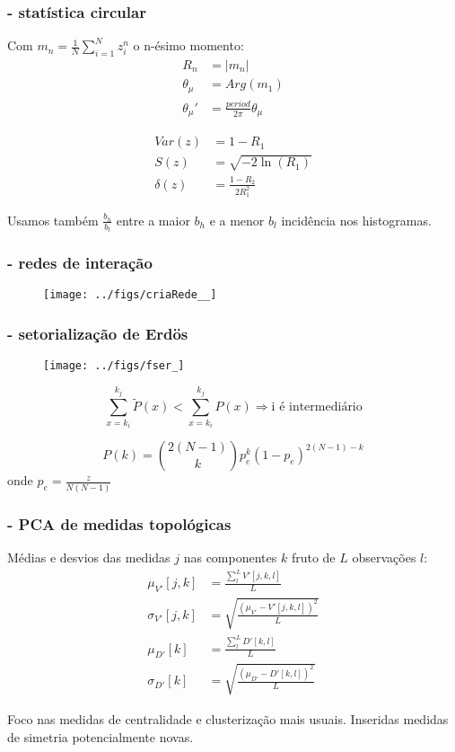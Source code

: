\documentclass[10pt]{beamer}
\begin{document}
\begin{frame}
\frametitle{ - statística circular}
Com $m_n=\frac{1}{N}\sum_{i=1}^N z_i^n$ o n-ésimo momento:
\begin{align}\label{eq:cmom}
    R_n&=|m_n| \nonumber \\
    \theta_\mu&=Arg(m_1) \\
    \theta_\mu'&=\frac{period}{2\pi} \theta_\mu \nonumber
\end{align}

\begin{align}
    Var(z)&=1 - R_1 \nonumber\\
    S(z)&= \sqrt{-2\ln(R_1)}\\
    \delta(z)&=\frac{1-R_2}{2 R_1^2} \nonumber
\end{align}

Usamos também $\frac{b_h}{b_l}$ entre a maior $b_h $ e a menor $b_l$ incidência nos histogramas.




\end{frame}
\begin{frame}
\frametitle{- redes de interação}
\begin{figure}[!h]
    \centering
    \texttt{[image: ../figs/criaRede\_\_]}
\end{figure}
\end{frame}
\begin{frame}
\frametitle{- setorialização de Erdös}

\begin{figure}[!h]
    \centering
    \texttt{[image: ../figs/fser\_]}
        \label{fig:setores}
\end{figure}

\begin{equation}\label{criterio2}
    \sum_{x=k_i}^{k_j} \widetilde{P}(x) < \sum_{x=k_i}^{k_j} P(x) \Rightarrow \text{i é intermediário}
\end{equation}

\begin{equation}
    P(k)=\binom{2(N-1)}{k}p_e^k(1-p_e)^{2(N-1)-k}
\end{equation}
onde 
\centering
$p_e=\frac{z}{N(N-1)}$


\end{frame}
\begin{frame}
\frametitle{- PCA de medidas topológicas}
Médias e desvios das medidas $j$ nas componentes $k$ fruto de $L$ observações $l$:
\begin{align}\label{eq:pca}
\mu_{V'}[j,k]   &=\frac{\sum_l^L V'[j,k,l]}{L}\nonumber\\
\sigma_{V'}[j,k]&=\sqrt{\frac{(\mu_{V'}-V'[j,k,l])^2}{L}}\\\nonumber
\mu_{D'}[k]&=\frac{\sum_l^L D'[k,l]}{L}\\\nonumber
\sigma_{D'}[k]&=\sqrt{\frac{(\mu_{D'}-D'[k,l])^2}{L}}
\end{align}

Foco nas medidas de centralidade e clusterização mais usuais. 
Inseridas medidas de simetria potencialmente novas.

\end{frame}
\end{document}
